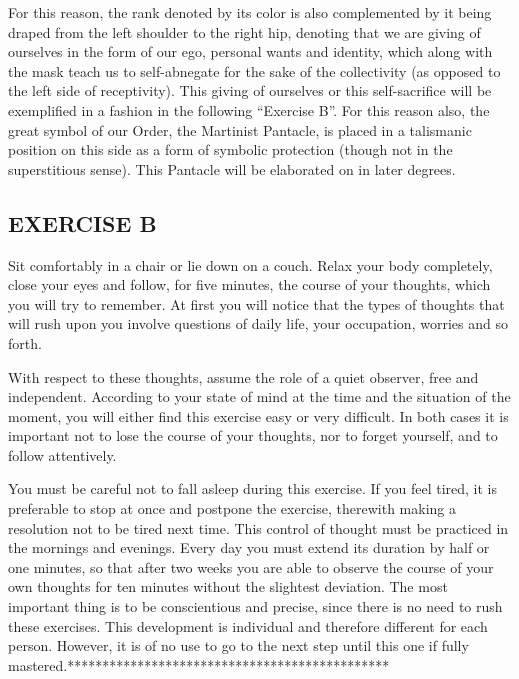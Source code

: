 For this reason, the rank denoted by its color is also complemented by it being draped from the left
shoulder to the right hip, denoting that we are giving of ourselves in the form of our ego, personal
wants and identity, which along with the mask teach us to self-abnegate for the sake of the collectivity
(as opposed to the left side of receptivity). This giving of ourselves or this self-sacrifice will be
exemplified in a fashion in the following ``Exercise B''. For this reason also, the great symbol of our
Order, the Martinist Pantacle, is placed in a talismanic position on this side as a form of symbolic
protection (though not in the superstitious sense). This Pantacle will be elaborated on in later degrees. 

\subsection{EXERCISE B}

Sit comfortably in a chair or lie down on a couch. Relax your body completely, close your eyes
and follow, for five minutes, the course of your thoughts, which you will try to remember. At
first you will notice that the types of thoughts that will rush upon you involve questions of daily
life, your occupation, worries and so forth.

With respect to these thoughts, assume the role of a quiet observer, free and independent.
According to your state of mind at the time and the situation of the moment, you will either find
this exercise easy or very difficult. In both cases it is important not to lose the course of your
thoughts, nor to forget yourself, and to follow attentively.

You must be careful not to fall asleep during this exercise. If you feel tired, it is preferable to 
stop at once and postpone the exercise, therewith making a resolution not to be tired next time.
This control of thought must be practiced in the mornings and evenings. Every day you must
extend its duration by half or one minutes, so that after two weeks you are able to observe the
course of your own thoughts for ten minutes without the slightest deviation. The most important
thing is to be conscientious and precise, since there is no need to rush these exercises. This
development is individual and therefore different for each person. However, it is of no use to go
to the next step until this one if fully mastered.********************************************** 